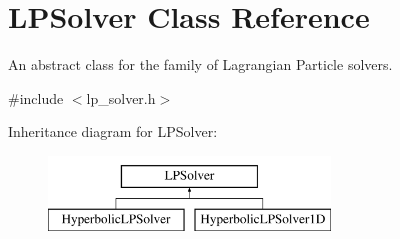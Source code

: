 \hypertarget{classLPSolver}{\section{L\-P\-Solver Class Reference}
\label{classLPSolver}
}


An abstract class for the family of Lagrangian Particle solvers.  




{\ttfamily \#include $<$lp\-\_\-solver.\-h$>$}

Inheritance diagram for L\-P\-Solver\-:\begin{figure}[H]
\begin{center}
\leavevmode
\includegraphics[height=2.000000cm]{classLPSolver}
\end{center}
\end{figure}
